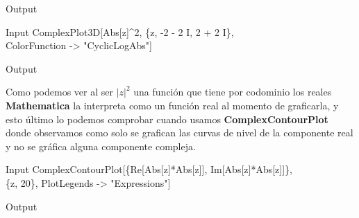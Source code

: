 \begin{mmaCell}[moregraphics={moreig={scale=.35}}]{Output}
\end{mmaCell}

\begin{mmaCell}{Input}
  ComplexPlot3D[Abs[z]^2, \{z, -2 - 2 I, 2 + 2 I\},\\ColorFunction -> "CyclicLogAbs"]
\end{mmaCell}

\begin{mmaCell}[moregraphics={moreig={scale=.4}}]{Output}
\end{mmaCell}
Como podemos ver al ser $|z|^2$ una función que tiene por codominio los reales \textbf{Mathematica} la interpreta como un función real al momento de graficarla, y esto último lo podemos comprobar cuando usamos \textbf{ComplexContourPlot} donde observamos como solo se grafican las curvas de nivel de la componente real y no se gráfica alguna componente compleja.
\begin{mmaCell}{Input}
	 ComplexContourPlot[\{Re[Abs[z]*Abs[z]], Im[Abs[z]*Abs[z]]\},\\\{z, 20\}, PlotLegends -> "Expressions"]
\end{mmaCell}

\begin{mmaCell}[moregraphics={moreig={scale=.35}}]{Output}
\end{mmaCell}


